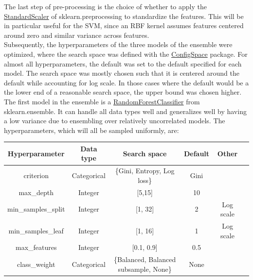 \documentclass[11pt]{article}
\begin{document}
The last step of pre-processing is  the choice of whether to apply the \href{https://scikit-learn.org/stable/modules/generated/sklearn.preprocessing.StandardScaler.html}{StandardScaler} of sklearn.preprocessing to standardize the features. This will be in particular useful for the SVM, since an RBF kernel assumes features centered around zero and similar variance across features. \\

Subsequently, the hyperparameters of the three models of the ensemble were optimized, where the search space was defined with the \href{https://automl.github.io/ConfigSpace/main/}{ConfigSpace} package. For almost all hyperparameters, the default was set to the default specified for each model. The search space was mostly chosen such that it is centered around the default while accounting for log scale. In those cases where the default would be a the lower end of a reasonable search space, the upper bound was chosen higher. \\

The first model in the ensemble is a \href{https://scikit-learn.org/stable/modules/generated/sklearn.ensemble.RandomForestClassifier.html}{RandomForestClassifier} from sklearn.ensemble. It can handle all data types well and generalizes well by having a low variance due to ensembling over relatively uncorrelated models. The hyperparameters, which will all be sampled uniformly, are:

\vspace{-0.3cm}
\begin{table}[H]
\begin{tabular}{ | c | c | c | c | c | c | }
 \hline
  Hyperparameter & Data type & Search space & Default & Other \\
 \hline
 criterion & Categorical & \{Gini, Entropy, Log loss\} & Gini &   \\ 
 max\_depth  & Integer & [5,15] & 10 &  \\ 
 min\_samples\_split & Integer & [1, 32] & 2 & Log scale \\ 
 min\_samples\_leaf & Integer & [1, 16] & 1 & Log scale  \\ 
 max\_features & Integer & [0.1, 0.9] & 0.5 &   \\  
 class\_weight & Categorical & \{Balanced, Balanced subsample, None\}  & None &  \\ 
 \hline
\end{tabular}
\end{table}
\vspace{-0.3cm}
\end{document}
